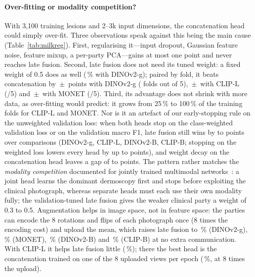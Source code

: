 \paragraph{Over-fitting or modality competition?}
With 3{,}100 training lesions and 2--3k input dimensions, the concatenation head could simply over-fit. Three observations speak against this being the main cause (Table~\ref{tab:milkreg}). First, regularising it---input dropout, Gaussian feature noise, feature mixup, a per-party PCA---gains at most one point and never reaches late fusion. Second, late fusion does not need its tuned weight: a fixed weight of 0.5 does as well (\mrGLateHalf\,\% with DINOv2-g); paired by fold, it beats concatenation by \mrGPairD\,$\pm$\,\mrGPairS{} points with DINOv2-g (\mrGPairW{} folds out of 5), \mrCPairD\,$\pm$\,\mrCPairS{} with CLIP-L (\mrCPairW/5) and \mrMPairD\,$\pm$\,\mrMPairS{} with MONET (\mrMPairW/5). Third, its advantage does not shrink with more data, as over-fitting would predict: it grows from 25\,\% to 100\,\% of the training folds for CLIP-L and MONET. Nor is it an artefact of our early-stopping rule on the unweighted validation loss: when both heads stop on the class-weighted validation loss or on the validation macro F1, late fusion still wins by \mrStopMin{} to \mrStopMax{} points over \mrStopN{} comparisons (DINOv2-g, CLIP-L, DINOv2-B, CLIP-B; stopping on the weighted loss lowers every head by up to \mrWlossDropMax{} points), and weight decay on the concatenation head leaves a gap of \mrWdMin{} to \mrWdMax{} points. The pattern rather matches the \emph{modality competition} documented for jointly trained multimodal networks~\cite{wang2020makes,huang2022modality,peng2022balanced}: a joint head learns the dominant dermoscopy first and stops before exploiting the clinical photograph, whereas separate heads must each use their own modality fully; the validation-tuned late fusion gives the weaker clinical party a weight of 0.3 to 0.5. Augmentation helps in image space, not in feature space: the parties can encode the 8 rotations and flips of each photograph once (8 times the encoding cost) and upload the mean, which raises late fusion to \mrGLateViews\,\% (DINOv2-g), \mrMLateViews\,\% (MONET), \fzViewsB\,\% (DINOv2-B) and \fzViewsCb\,\% (CLIP-B) at no extra communication. With CLIP-L it helps late fusion little (\mrCLateViews\,\%); there the best head is the concatenation trained on one of the 8 uploaded views per epoch (\mrCCatSampled\,\%, at 8 times the upload).

